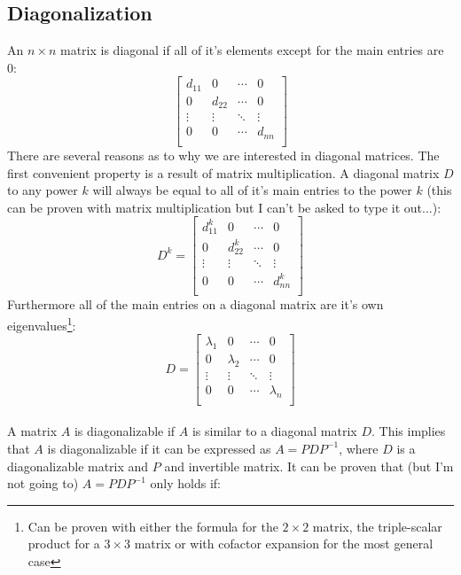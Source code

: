 \documentclass[11pt, a4paper]{article}
\begin{document}
\subsection{Diagonalization}
An $n \times n$ matrix is diagonal if all of it's elements except for the main entries are $0$:
\begin{equation}
  \begin{bmatrix}
    d_{11} & 0      & \cdots & 0\\
    0      & d_{22} & \cdots & 0\\
    \vdots & \vdots & \ddots & \vdots\\
    0      & 0      & \cdots & d_{nn}\\
  \end{bmatrix}
\end{equation}
There are several reasons as to why we are interested in diagonal matrices. The first convenient property is a result of matrix multiplication. A diagonal matrix $D$ to any power $k$ will always be equal to all of it's main entries to the power $k$ (this can be proven with matrix multiplication but I can't be asked to type it out...):
\begin{equation}
  D^k = 
  \begin{bmatrix}
    d_{11}^k & 0       & \cdots & 0\\
    0       & d_{22}^k & \cdots & 0\\
    \vdots  & \vdots   & \ddots & \vdots\\
    0       & 0        & \cdots & d_{nn}^k\\
  \end{bmatrix}
\end{equation}
Furthermore all of the main entries on a diagonal matrix are it's own eigenvalues\footnote{Can be proven with either the formula for the $2 \times 2$ matrix, the triple-scalar product for a $3 \times 3$ matrix or with cofactor expansion for the most general case}:
\begin{equation}
  D =
  \begin{bmatrix}
    \lambda_1 & 0         & \cdots & 0\\
    0         & \lambda_2 & \cdots & 0\\
    \vdots    & \vdots    & \ddots & \vdots\\
    0         & 0         & \cdots & \lambda_n\\
  \end{bmatrix}
\end{equation}
\\
A matrix $A$ is diagonalizable if $A$ is similar to a diagonal matrix $D$. This implies that $A$ is diagonalizable if it can be expressed as $A=PDP^{-1}$, where $D$ is a diagonalizable matrix and $P$ and invertible matrix. It can be proven that (but I'm not going to) $A=PDP^{-1}$ only holds if:
\end{document}
